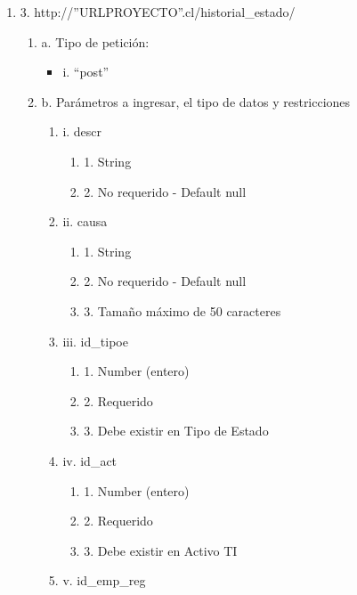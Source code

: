 \begin{enumerate}
    \item 3. http://”URLPROYECTO”.cl/historial\_estado/
    \begin{enumerate}
        \item a. Tipo de petición:
            \begin{itemize}
               \item i. “post”
            \end{itemize}
        \item b. Parámetros a ingresar, el tipo de datos y restricciones
            \begin{enumerate}
                \item i. descr
                    \begin{enumerate}
                        \item 1. String
                        \item 2. No requerido - Default null
                    \end{enumerate}
                \item ii. causa
                    \begin{enumerate}
                        \item 1. String
                        \item 2. No requerido - Default null
                        \item 3. Tamaño máximo de 50 caracteres
                    \end{enumerate}
                \item iii. id\_tipoe
                    \begin{enumerate}
                        \item 1. Number (entero)
                        \item 2. Requerido
                        \item 3. Debe existir en Tipo de Estado
                    \end{enumerate}
                \item iv. id\_act
                    \begin{enumerate}
                        \item 1. Number (entero)
                        \item 2. Requerido
                        \item 3. Debe existir en Activo TI
                    \end{enumerate}
                \item v. id\_emp\_reg

\end{enumerate}
\end{enumerate}
\end{enumerate}
